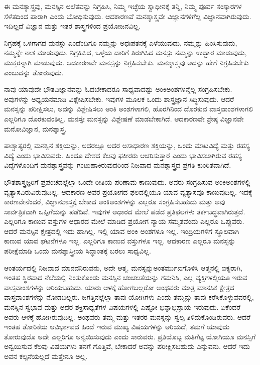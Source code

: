 ಈ ಮನಶ್ಶಾಸ್ತ್ರವು, ಮನಸ್ಸಿನ ಅಲೆತವನ್ನು ನಿಗ್ರಹಿಸಿ, ನಿಮ್ಮ ಇಚ್ಛೆಯ ಸ್ವಾಧೀನಕ್ಕೆ ತನ್ನಿ, ನಿಮ್ಮ ಪೂರ್ವ ಸಂಸ್ಕಾರಗಳ ಸೆಳೆತದಿಂದ ಪಾರಾಗಿ ಎಂದು ಬೋಧಿಸುವುದು. ಆದಕಾರಣವೆ ಮನಶ್ಶಾಸ್ತ್ರವೇ ವಿಜ್ಞಾನಗಳಿಗೆಲ್ಲ ವಿಜ್ಞಾನವಾಗಿರುವುದು. ಇದಿಲ್ಲದೆ ವಿಜ್ಞಾನ ಮತ್ತು ಇತರ ಶಾಸ್ತ್ರಗಳಿಂದ ಪ್ರಯೋಜನವಿಲ್ಲ.

ನಿಗ್ರಹಕ್ಕೆ ಒಳಗಾಗದ ಮನಸ್ಸು ಎಂದೆಂದಿಗೂ ನಮ್ಮನ್ನು ಅಧಃಪತನಕ್ಕೆ ಎಳೆಯುವುದು, ನಮ್ಮನ್ನು ಹಿಂಸಿಸುವುದು, ನಮ್ಮನ್ನೇ ನಾಶ ಮಾಡುವುದು. ನಿಗ್ರಹಿಸಿದ, ಒಳ್ಳೆಯ ದಾರಿಗೆ ತಿರುಗಿಸಿದ ಮನಸ್ಸು ನಮ್ಮನ್ನು ಉದ್ದಾರ ಮಾಡುವುದು, ಮುಕ್ತರನ್ನಾಗಿ ಮಾಡುವುದು. ಆದಕಾರಣವೇ ಮನಸ್ಸನ್ನು ನಿಗ್ರಹಿಸಬೇಕು. ಮನಶ್ಶಾಸ್ತ್ರವು ಅದನ್ನು ಹೇಗೆ ನಿಗ್ರಹಿಸಬೇಕು ಎಂಬುದನ್ನು ತೋರುವುದು.

ನಾವು ಯಾವುದೇ ಭೌತವಿಜ್ಞಾನವನ್ನು ಓದಬೇಕಾದರೂ ಸಾಧ್ಯವಾದಷ್ಟು ಅಂಕಿಅಂಶಗಳನ್ನೆಲ್ಲ ಸಂಗ್ರಹಿಸಬೇಕು. ಅವುಗಳನ್ನು ಅಧ್ಯಯನಮಾಡಿ ವಿಶ್ಲೇಷಿಸಬೇಕು. ಇವುಗಳ ಮೂಲಕ ಒಂದು ಶಾಸ್ತ್ರಜ್ಞಾನ ಸಿದ್ಧಿಸುವುದು. ಆದರೆ ಮನಸ್ಸನ್ನು ಪರೀಕ್ಷಿಸಲು, ಅದನ್ನು ವಿಶ್ಲೇಷಿಸಲು ಅಂಕಿ ಅಂಶಗಳಾಗಲಿ, ಹೊರಗಿನಿಂದ ದೊರಕುವ ವಾಸ್ತವಾಂಶಗಳಾಗಲಿ ಎಲ್ಲರಿಗೂ ದೊರಕುವಂತಿಲ್ಲ. ಮನಸ್ಸೇ ಮನಸ್ಸನ್ನು ವಿಶ್ಲೇಷಣೆ ಮಾಡಬೇಕಾಗಿದೆ. ಆದಕಾರಣವೇ ಶ್ರೇಷ್ಠ ವಿಜ್ಞಾನವೇ ಮನೋವಿಜ್ಞಾನ, ಮನಶ್ಶಾಸ್ತ್ರ.

ಪಾಶ್ಚಾತ್ಯರಲ್ಲಿ ಮನಸ್ಸಿನ ಶಕ್ತಿಯನ್ನು, ಅದರಲ್ಲೂ ಅದರ ಅಸಾಧಾರಣ ಶಕ್ತಿಯನ್ನು, ಒಂದು ಮಾಟವಿದ್ಯೆ ಮತ್ತು ರಹಸ್ಯ ವಿದ್ಯೆ ಎಂದು ಭಾವಿಸುವರು. ಹಿಂದೂ ದೇಶದ ಕೆಲವು ಫಕೀರರು ಆಚರಿಸುತ್ತಾರೆ ಎಂದು ಭಾವಿಸಲಾಗಿರುವ ರಹಸ್ಯ ವಿದ್ಯೆಗಳೊಂದಿಗೆ ಮನಶ್ಶಾಸ್ತ್ರವನ್ನು ಗಂಟುಹಾಕಿರುವುದರಿಂದ ನಿಜವಾದ ಮನಶ್ಶಾಸ್ತ್ರದ ಪ್ರಗತಿ ಕುಂಠಿತವಾಗಿದೆ.

ಭೌತಶಾಸ್ತ್ರಜ್ಞರಿಗೆ ಪ್ರಪಂಚದಲ್ಲೆಲ್ಲಾ ಒಂದೇ ರೀತಿಯ ಪರಿಣಾಮ ಕಾಣುವುದು. ಅವರು ಸಂಗ್ರಹಿಸುವ ಅಂಕಿಅಂಶಗಳಲ್ಲಿ ವ್ಯತ್ಯಾಸವಿರುವಿರುವುದಿಲ್ಲ. ಆದಕಾರಣ ಅವರ ಪ್ರಯೋಗದ ಫಲದಲ್ಲಿಯೂ ಯಾವ ವ್ಯತ್ಯಾಸವೂ ಕಾಣುವುದಿಲ್ಲ. ಇದಕ್ಕೆ ಕಾರಣವೇನೆಂದರೆ, ವಿಜ್ಞಾನಶಾಸ್ತ್ರಕ್ಕೆ ಬೇಕಾದ ಅಂಕಿಅಂಶಗಳನ್ನು ಎಲ್ಲರೂ ಸಂಗ್ರಹಿಸಬಹುದು ಮತ್ತು ಅವು ಸಾರ್ವತ್ರಿಕವಾಗಿ ಒಪ್ಪಿಗೆಯನ್ನು ಪಡೆದಿವೆ. ಇವುಗಳ ಆಧಾರದ ಮೇಲೆ ಪಡೆದ ಪ್ರತಿಫಲಗಳು ತರ್ಕಬದ್ಧವಾಗಿರುತ್ತದೆ. ಎಲ್ಲರಿಗೂ ಕಾಣುವ ವಸ್ತುಗಳ ಆಧಾರದ ಮೇಲೆ ಮಾಡಿದ ಪ್ರಯೋಗ ನ್ಯಾಯ ಸಮ್ಮತವೆಂದು ಎಲ್ಲರೂ ಒಪ್ಪುವರು. ಆದರೆ ಮನಸ್ಸಿನ ಕ್ಷೇತ್ರದಲ್ಲಿ ಇದು ಹಾಗಿಲ್ಲ. ಇಲ್ಲಿ ಯಾವ ಅಂಕಿ ಅಂಶಗಳೂ ಇಲ್ಲ. ಇಂದ್ರಿಯಗಳಿಗೆ ಸ್ಥೂಲವಾಗಿ ಕಾಣುವ ಯಾವ ಘಟನೆಗಳೂ ಇಲ್ಲ. ಎಲ್ಲರಿಗೂ ಕಾಣುವ ವಸ್ತುಗಳೂ ಇಲ್ಲ. ಆದಕಾರಣ ಎಲ್ಲರೂ ಮನಸ್ಸನ್ನು ಪರೀಕ್ಷೆಮಾಡಿ ಒಂದು ಮನಶ್ಶಾಸ್ತ್ರೀಯ ಸಿದ್ಧಾಂತಕ್ಕೆ ಬರಲು ಸಾಧ್ಯವಿಲ್ಲ.

\newpage

ಆಂತರ್ಯದಲ್ಲಿ ನಿಜವಾದ ಮಾನವನಿರುವನು, ಅದೇ ಆತ್ಮ. ಮನಸ್ಸನ್ನು\break ಅಂತರ್ಮುಖಗೊಳಿಸಿ ಆತ್ಮನಲ್ಲಿ ಐಕ್ಯರಾಗಿ, ಇಂತಹ ಸ್ಥಿರವಾದ ನೆಲೆಯಲ್ಲಿ ನಿಂತುಕೊಂಡು ಮನಸ್ಸಿನ ಚಂಚಲತೆಯನ್ನು ಗಮನಿಸಿ, ಎಲ್ಲ ವ್ಯಕ್ತಿಗಳಲ್ಲಿಯೂ ಇರುವ ವಾಸ್ತವಾಂಶಗಳನ್ನು ಅರಿಯಬಹುದು. ಯಾರು ಆಳಕ್ಕೆ ಹೋಗಬಲ್ಲರೋ ಅಂಥವರು ಮಾತ್ರ ಮಾನಸಿಕ ಕ್ಷೇತ್ರದ ವಾಸ್ತವಾಂಶಗಳನ್ನು ನೋಡಬಲ್ಲರು. ಜಗತ್ತಿನಲ್ಲೆಲ್ಲಾ ತಾವು ಯೋಗಿಗಳು ಎಂದು ತಮ್ಮನ್ನು ತಾವು ಕರೆಸಿಕೊಳ್ಳುವವರಲ್ಲಿ, ಮನಸ್ಸಿನ ಸ್ವಭಾವ ಮತ್ತು ಅದರ ಶಕ್ತಿಸಾಧ್ಯತೆಗಳ ವಿಷಯಗಳಲ್ಲಿ ಎಷ್ಟೋ ಭಿನ್ನಾಭಿಪ್ರಾಯ ಇರುವುದು. ಏಕೆಂದರೆ ಅವರು ಆಳಕ್ಕೆ ಹೋಗಿರುವುದಿಲ್ಲ. ಅಂಥವರು ತಮ್ಮ ಮತ್ತು ಇತರರ ಮನಸ್ಸನ್ನು ಸ್ವಲ್ಪ ತಿಳಿದುಕೊಂಡಿರುವರು. ಆದರೆ ಇಂತಹ ತೋರಿಕೆಯ ಆವಿರ್ಭಾವದ ಹಿಂದೆ ಇರುವ ಮುಖ್ಯ ವಿಷಯಗಳನ್ನು ಅರಿಯದೆ, ತಮಗೆ ಯಾವುದು ತೋರುವುದೊ ಅದೇ ಎಲ್ಲರಿಗೂ ಅನ್ವಯಿಸುವುದು ಎಂದು ಸಾರುವರು. ಪ್ರತಿಯೊಬ್ಬ ಮತಿಗೆಟ್ಟ ಯೋಗಿಯೂ ಮನಸ್ಸಿಗೆ ಅನ್ವಯಿಸುವ ಕೆಲವು ವಿಷಯಗಳು ತನಗೆ ಗೊತ್ತಿವೆ, ಬೇಕಾದರೆ ಅವನ್ನು ಪರೀಕ್ಷಿಸಬಹುದು ಎನ್ನುವನು. ಆದರೆ ಇದು ಅವನ ಕಲ್ಪನೆಯಲ್ಲದೆ ಮತ್ತೇನೂ ಅಲ್ಲ.

